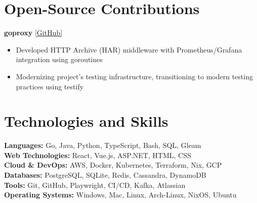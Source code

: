 \documentclass[10pt,a4paper]{article}
\begin{document}
	\section{Open-Source Contributions}
	\textbf{goproxy} \href{https://github.com/elazarl/goproxy}{[GitHub]}
	\begin{itemize}[label=\textbullet, itemsep=0.02cm]
		\item Developed HTTP Archive (HAR) middleware with Prometheus/Grafana integration using goroutines
		\item Modernizing project's testing infrastructure, transitioning to modern testing practices using testify
	\end{itemize}
	
	\section{Technologies and Skills}
	\textbf{Languages:} Go, Java, Python, TypeScript, Bash, SQL, Gleam \\
	\textbf{Web Technologies:} React, Vue.js, ASP.NET, HTML, CSS \\
	\textbf{Cloud \& DevOps:} AWS, Docker, Kubernetes, Terraform, Nix, GCP \\
	\textbf{Databases:} PostgreSQL, SQLite, Redis, Cassandra, DynamoDB \\
	\textbf{Tools:} Git, GitHub, Playwright, CI/CD, Kafka, Atlassian \\
	\textbf{Operating Systems:} Windows, Mac, Linux, Arch-Linux, NixOS, Ubuntu
	
\end{document}
